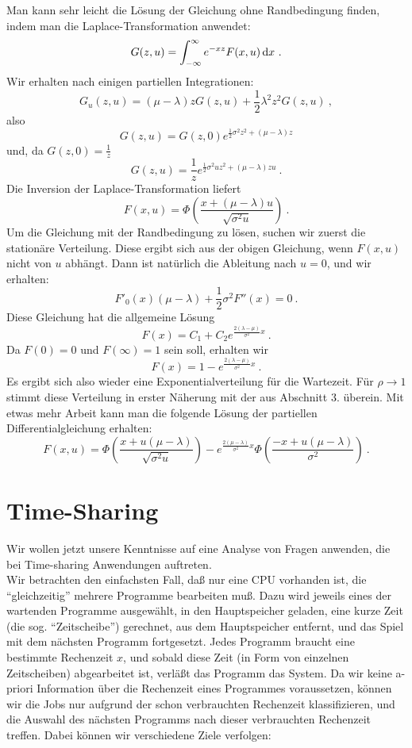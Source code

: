 \begin{enumerate}
Man kann sehr leicht die Lösung der Gleichung ohne Randbedingung finden, indem man die Laplace-Transformation anwendet:
\[G(z,u)=\int_{-\infty}^{\infty} e^{-xz}F(x,u)\mathop{}\!\mathrm{d} x ~.\]
Wir erhalten nach einigen partiellen Integrationen:
\[G_{u}(z,u) = (\mu-\lambda)zG(z,u)+\frac{1}{2}\lambda^{2}z^{2}G(z,u) ~, \]
also
\[ G(z,u) = G(z,0)e^{\frac{1}{2}\sigma^{2}z^{2}+(\mu - \lambda)z}  \]
und, da $G(z,0)=\frac{1}{z}$
\[G(z,u) = \frac{1}{z}e^{\frac{1}{2}\sigma^{2}uz^{2}+(\mu - \lambda)zu} ~.\]
Die Inversion der Laplace-Transformation liefert
\[F(x,u)=\Phi\left(\frac{x+(\mu - \lambda)u}{\sqrt{\sigma^{2}u}}\right) ~.  \]
Um die Gleichung mit der Randbedingung zu lösen, suchen wir zuerst die stationäre Verteilung. Diese ergibt sich aus der obigen Gleichung, wenn $F(x,u)$ nicht
von $u$ abhängt. Dann ist natürlich die Ableitung nach $u = 0$, und wir erhalten:
\[ F'_{0}(x)(\mu - \lambda)+\frac{1}{2}\sigma^{2}F''(x)=0 ~. \]
Diese Gleichung hat die allgemeine Lösung
\[F(x) = C_{1}+C_{2}e^{\frac{2(\lambda - \mu)}{\sigma^{2}}x} ~. \]
Da $F(0) = 0$ und $F(\infty) = 1$ sein soll, erhalten wir
\[F(x) = 1-e^{\frac{2(\lambda - \mu)}{\sigma^{2}}x} ~.  \]
Es ergibt sich also wieder eine Exponentialverteilung für die Wartezeit. Für $\rho \rightarrow 1$ stimmt diese Verteilung in erster Näherung mit der aus
Abschnitt $3.$ überein. Mit etwas mehr Arbeit kann man die folgende Lösung der partiellen Differentialgleichung erhalten:
\[F(x,u)=\Phi\left(\frac{x+u(\mu - \lambda)}{\sqrt{\sigma^{2}u}}\right)-e^{\frac{2(\mu - \lambda)}{\sigma^{2}}x}\Phi\left(\frac{-x+u(\mu -
\lambda)}{\sigma^{2}}\right) ~.\]
\end {enumerate}
\chapter{Time-Sharing}
Wir wollen jetzt unsere Kenntnisse auf eine Analyse von Fragen anwenden, die bei Time-sharing Anwendungen auftreten. \\
Wir betrachten den einfachsten Fall, daß nur eine CPU vorhanden ist, die \enquote{gleichzeitig} mehrere Programme bearbeiten muß.
Dazu wird jeweils eines der wartenden Programme ausgewählt, in den Hauptspeicher geladen, eine kurze Zeit (die sog. \enquote{Zeitscheibe}) gerechnet,
aus dem
Hauptspeicher entfernt, und das Spiel mit dem nächsten Programm fortgesetzt. Jedes Programm braucht eine bestimmte Rechenzeit $x$, und sobald
diese Zeit (in
Form von einzelnen Zeitscheiben) abgearbeitet ist, verläßt das Programm das System. Da wir keine a-priori Information über die Rechenzeit eines Programmes
voraussetzen, können wir die Jobs nur aufgrund der schon verbrauchten Rechenzeit klassifizieren, und die Auswahl des nächsten Programms nach dieser verbrauchten
Rechenzeit treffen. Dabei können wir verschiedene Ziele verfolgen:

